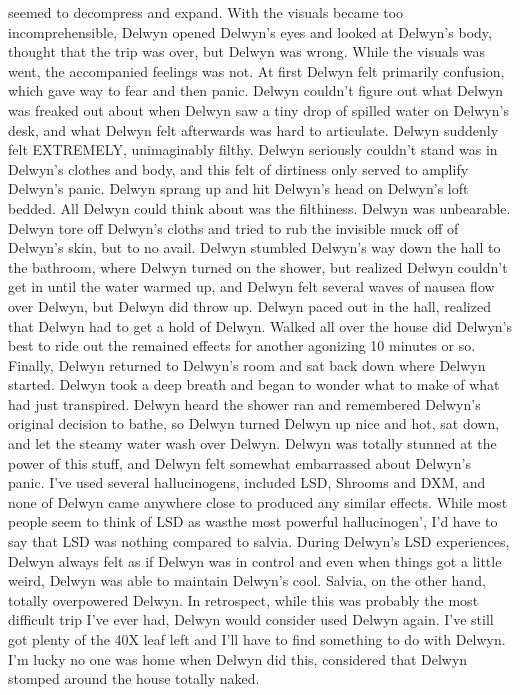 \documentclass[12pt]{book}
\begin{document}
seemed to decompress and expand. With the visuals became too incomprehensible, Delwyn opened Delwyn's eyes and looked at Delwyn's body, thought that the trip was over, but Delwyn was wrong. While the visuals was went, the accompanied feelings was not. At first Delwyn felt primarily confusion, which gave way to fear and then panic. Delwyn couldn't figure out what Delwyn was freaked out about when Delwyn saw a tiny drop of spilled water on Delwyn's desk, and what Delwyn felt afterwards was hard to articulate. Delwyn suddenly felt EXTREMELY, unimaginably filthy. Delwyn seriously couldn't stand was in Delwyn's clothes and body, and this felt of dirtiness only served to amplify Delwyn's panic. Delwyn sprang up and hit Delwyn's head on Delwyn's loft bedded. All Delwyn could think about was the filthiness. Delwyn was unbearable. Delwyn tore off Delwyn's cloths and tried to rub the invisible muck off of Delwyn's skin, but to no avail. Delwyn stumbled Delwyn's way down the hall to the bathroom, where Delwyn turned on the shower, but realized Delwyn couldn't get in until the water warmed up, and Delwyn felt several waves of nausea flow over Delwyn, but Delwyn did throw up. Delwyn paced out in the hall, realized that Delwyn had to get a hold of Delwyn. Walked all over the house did Delwyn's best to ride out the remained effects for another agonizing 10 minutes or so. Finally, Delwyn returned to Delwyn's room and sat back down where Delwyn started. Delwyn took a deep breath and began to wonder what to make of what had just transpired. Delwyn heard the shower ran and remembered Delwyn's original decision to bathe, so Delwyn turned Delwyn up nice and hot, sat down, and let the steamy water wash over Delwyn. Delwyn was totally stunned at the power of this stuff, and Delwyn felt somewhat embarrassed about Delwyn's panic. I've used several hallucinogens, included LSD, Shrooms and DXM, and none of Delwyn came anywhere close to produced any similar effects. While most people seem to think of LSD as wasthe most powerful hallucinogen', I'd have to say that LSD was nothing compared to salvia. During Delwyn's LSD experiences, Delwyn always felt as if Delwyn was in control and even when things got a little weird, Delwyn was able to maintain Delwyn's cool. Salvia, on the other hand, totally overpowered Delwyn. In retrospect, while this was probably the most difficult trip I've ever had, Delwyn would consider used Delwyn again. I've still got plenty of the 40X leaf left and I'll have to find something to do with Delwyn. I'm lucky no one was home when Delwyn did this, considered that Delwyn stomped around the house totally naked.
\end{document}
